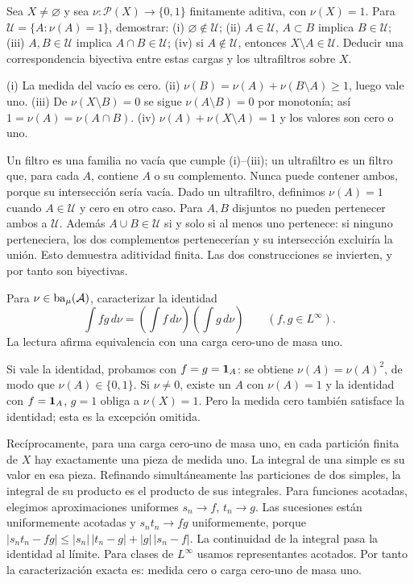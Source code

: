 \begin{ejercicio}\label{ej:v2-l29-3}
Sea $X\ne\varnothing$ y sea $\nu:\mathcal P(X)\to\{0,1\}$ finitamente aditiva, con $\nu(X)=1$. Para $\mathcal U=\{A:\nu(A)=1\}$, demostrar: (i) $\varnothing\notin\mathcal U$; (ii) $A\in\mathcal U$, $A\subset B$ implica $B\in\mathcal U$; (iii) $A,B\in\mathcal U$ implica $A\cap B\in\mathcal U$; (iv) si $A\notin\mathcal U$, entonces $X\setminus A\in\mathcal U$. Deducir una correspondencia biyectiva entre estas cargas y los ultrafiltros sobre $X$.
\end{ejercicio}
\begin{solucion}
(i) La medida del vacío es cero. (ii) $\nu(B)=\nu(A)+\nu(B\setminus A)\ge1$, luego vale uno. (iii) De $\nu(X\setminus B)=0$ se sigue $\nu(A\setminus B)=0$ por monotonía; así $1=\nu(A)=\nu(A\cap B)$. (iv) $\nu(A)+\nu(X\setminus A)=1$ y los valores son cero o uno.

Un filtro es una familia no vacía que cumple (i)--(iii); un ultrafiltro es un filtro que, para cada $A$, contiene $A$ o su complemento. Nunca puede contener ambos, porque su intersección sería vacía. Dado un ultrafiltro, definimos $\nu(A)=1$ cuando $A\in\mathcal U$ y cero en otro caso. Para $A,B$ disjuntos no pueden pertenecer ambos a $\mathcal U$. Además $A\cup B\in\mathcal U$ si y solo si al menos uno pertenece: si ninguno perteneciera, los dos complementos pertenecerían y su intersección excluiría la unión. Esto demuestra aditividad finita. Las dos construcciones se invierten, y por tanto son biyectivas.
\end{solucion}

\begin{ejercicio}\label{ej:v2-l29-4}
Para $\nu\in\operatorname{ba}_\mu(\mathcal A)$, caracterizar la identidad
\[
 \int fg\,d\nu=\left(\int f\,d\nu\right)\left(\int g\,d\nu\right)
 \qquad(f,g\in L^\infty).
\]
La lectura afirma equivalencia con una carga cero-uno de masa uno.
\end{ejercicio}
\begin{solucion}
Si vale la identidad, probamos con $f=g=\mathbf1_{A}$: se obtiene $\nu(A)=\nu(A)^2$, de modo que $\nu(A)\in\{0,1\}$. Si $\nu\ne0$, existe un $A$ con $\nu(A)=1$ y la identidad con $f=\mathbf1_{A}$, $g=1$ obliga a $\nu(X)=1$. Pero la medida cero también satisface la identidad; esta es la excepción omitida.

Recíprocamente, para una carga cero-uno de masa uno, en cada partición finita de $X$ hay exactamente una pieza de medida uno. La integral de una simple es su valor en esa pieza. Refinando simultáneamente las particiones de dos simples, la integral de su producto es el producto de sus integrales. Para funciones acotadas, elegimos aproximaciones uniformes $s_n\to f$, $t_n\to g$. Las sucesiones están uniformemente acotadas y $s_nt_n\to fg$ uniformemente, porque $|s_nt_n-fg|\le|s_n|\,|t_n-g|+|g|\,|s_n-f|$. La continuidad de la integral pasa la identidad al límite. Para clases de $L^\infty$ usamos representantes acotados. Por tanto la caracterización exacta es: medida cero o carga cero-uno de masa uno.
\end{solucion}

